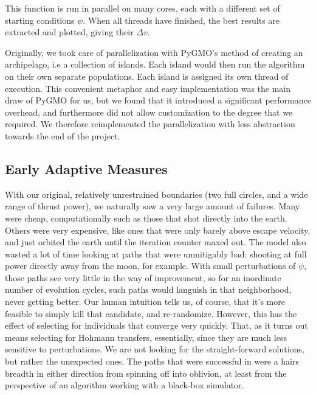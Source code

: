 This function is run in parallel on many cores, each with a different set of starting conditions \(\psi\). When all threads have finished, the best results are extracted and plotted, giving their \(\Delta v\).

Originally, we took care of parallelization with PyGMO's method of creating an archipelago, i.e a collection of islands. Each island would then run the algorithm on their own separate populations. Each island is assigned its own thread of execution. This convenient metaphor and easy implementation was the main draw of PyGMO for us, but we found that it introduced a significant performance overhead, and furthermore did not allow customization to the degree that we required. We therefore reimplemented the parallelization with less abstraction towards the end of the project.

\subsection{Early Adaptive Measures}
With our original, relatively unrestrained boundaries (two full circles, and a wide range of thrust power), we naturally saw a very large amount of failures. Many were cheap, computationally such as those that shot directly into the earth. Others were very expensive, like ones that were only barely above escape velocity, and just orbited the earth until the iteration counter maxed out. The model also wasted a lot of time looking at paths that were unmitigably bad: shooting at full power directly away from the moon, for example. With small perturbations of $\psi$, those paths see very little in the way of improvement, so for an inordinate number of evolution cycles, such paths would languish in that neighborhood, never getting better. Our human intuition tells us, of course, that it's more feasible to simply kill that candidate, and re-randomize. However, this has the effect of selecting for individuals that converge very quickly. That, as it turns out means selecting for Hohmann transfers, essentially, since they are much less sensitive to perturbations. We are not looking for the straight-forward solutions, but rather the unexpected ones. The paths that were successful in \cite{Saxe2015} were a hairs breadth in either direction from spinning off into oblivion, at least from the perspective of an algorithm working with a black-box simulator. 


